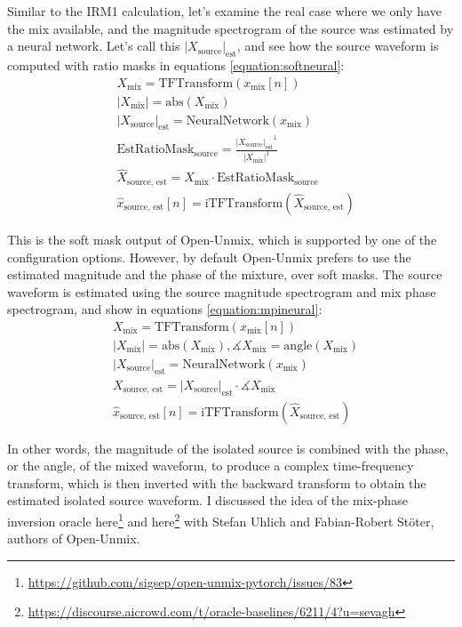 \documentclass[report.tex]{subfiles}
\begin{document}
Similar to the IRM1 calculation, let's examine the real case where we only have the mix available, and the magnitude spectrogram of the source was estimated by a neural network. Let's call this $|X_{\text{source}}|_{\text{est}}$, and see how the source waveform is computed with ratio masks in equations \ref{equation:softneural}:
\begin{align}\tag{2}\label{equation:softneural}
	\nonumber & X_{\text{mix}} = \text{TFTransform}(x_{\text{mix}}[n])\\
	\nonumber & |X_{\text{mix}}| = \text{abs}(X_{\text{mix}})\\
	\nonumber & {|X_{\text{source}}|}_{\text{est}} = \text{NeuralNetwork}(x_{\text{mix}})\\
	\nonumber & \text{EstRatioMask}_{\text{source}} = \frac{{|X_{\text{source}}|_{\text{est}}}^{1}}{|X_{\text{mix}}|^{1}}\\
	\nonumber & \hat{X}_{\text{source, est}} = X_{\text{mix}} \cdot \text{EstRatioMask}_{\text{source}}\\
	\nonumber & \hat{x}_{\text{source, est}}[n] = \text{iTFTransform}(\hat{X}_{\text{source, est}})
\end{align}

This is the soft mask output of Open-Unmix, which is supported by one of the configuration options. However, by default Open-Unmix prefers to use the estimated magnitude and the phase of the mixture, over soft masks. The source waveform is estimated using the source magnitude spectrogram and mix phase spectrogram, and show in equations \ref{equation:mpineural}:
\begin{align}\tag{3}\label{equation:mpineural}
	\nonumber & X_{\text{mix}} = \text{TFTransform}(x_{\text{mix}}[n])\\
	\nonumber & |X_{\text{mix}}| = \text{abs}(X_{\text{mix}}), \measuredangle{X_{\text{mix}}} = \text{angle}(X_{\text{mix}})\\
	\nonumber & {|X_{\text{source}}|}_{\text{est}} = \text{NeuralNetwork}(x_{\text{mix}})\\
	\nonumber & X_{\text{source, est}} = {|X_{\text{source}}|}_{\text{est}} \cdot \measuredangle{X_{\text{mix}}}\\
	\nonumber & \hat{x}_{\text{source, est}}[n] = \text{iTFTransform}(\hat{X}_{\text{source, est}})
\end{align}

In other words, the magnitude of the isolated source is combined with the phase, or the angle, of the mixed waveform, to produce a complex time-frequency transform, which is then inverted with the backward transform to obtain the estimated isolated source waveform. I discussed the idea of the mix-phase inversion oracle here\footnote{\url{https://github.com/sigsep/open-unmix-pytorch/issues/83}} and here\footnote{\url{https://discourse.aicrowd.com/t/oracle-baselines/6211/4?u=sevagh}} with Stefan Uhlich and Fabian-Robert St{\"o}ter, authors of Open-Unmix.
\end{document}
